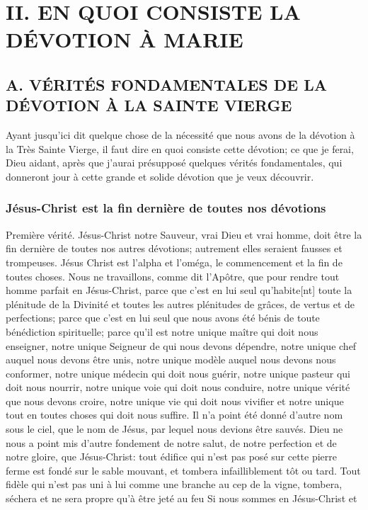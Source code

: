 \section{II. EN QUOI CONSISTE LA DÉVOTION À MARIE}
\subsection{A. VÉRITÉS FONDAMENTALES DE LA DÉVOTION À LA SAINTE VIERGE}
 Ayant jusqu'ici dit quelque chose de la nécessité que nous avons de la dévotion à la Très Sainte Vierge, il faut
dire en quoi consiste cette dévotion; ce que je ferai, Dieu aidant, après que j'aurai présupposé quelques vérités
fondamentales, qui donneront jour à cette grande et solide dévotion que je veux découvrir.
\subsubsection{Jésus-Christ est la fin dernière de toutes nos dévotions}
 Première vérité. Jésus-Christ notre Sauveur, vrai Dieu et vrai homme, doit être la fin dernière de toutes nos
autres dévotions; autrement elles seraient fausses et trompeuses. Jésus Christ est l'alpha et l'oméga, le
commencement et la fin de toutes choses. Nous ne travaillons, comme dit l'Apôtre, que pour rendre tout homme
parfait en Jésus-Christ, parce que c'est en lui seul qu'habite[nt] toute la plénitude de la Divinité et toutes les autres
plénitudes de grâces, de vertus et de perfections; parce que c'est en lui seul que nous avons été bénis de toute
bénédiction spirituelle; parce qu'il est notre unique maître qui doit nous enseigner, notre unique Seigneur de qui
nous devons dépendre, notre unique chef auquel nous devons être unis, notre unique modèle auquel nous devons
nous conformer, notre unique médecin qui doit nous guérir, notre unique pasteur qui doit nous nourrir, notre unique
voie qui doit nous conduire, notre unique vérité que nous devons croire, notre unique vie qui doit nous vivifier et
notre unique tout en toutes choses qui doit nous suffire. Il n'a point été donné d'autre nom sous le ciel, que le nom
de Jésus, par lequel nous devions être sauvés. Dieu ne nous a point mis d'autre fondement de notre salut, de
notre perfection et de notre gloire, que Jésus-Christ: tout édifice qui n'est pas posé sur cette pierre ferme est fondé
sur le sable mouvant, et tombera infailliblement tôt ou tard. Tout fidèle qui n'est pas uni à lui comme une branche
au cep de la vigne, tombera, séchera et ne sera propre qu'à être jeté au feu Si nous sommes en Jésus-Christ et
